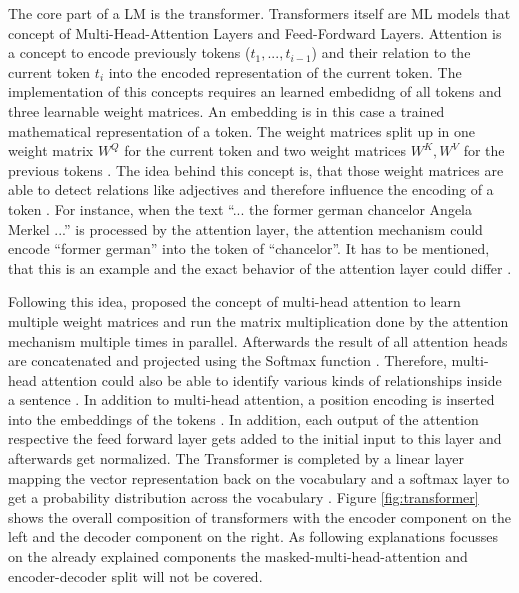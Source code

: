 \documentclass[a4paper,oneside,bibliography=totoc]{scrbook}
\begin{document}
The core part of a \ac{LM} is the transformer. Transformers itself are \ac{ML} models that concept of Multi-Head-Attention Layers and Feed-Fordward Layers. Attention is a concept to encode previously tokens ($t_1,...,t_{i-1}$) and their relation to the current token $t_i$ into the encoded representation of the current token. The implementation of this concepts requires an learned embedidng of all tokens and three learnable weight matrices. An embedding is in this case a trained mathematical representation of a token. The weight matrices split up in one weight matrix $W^Q$ for the current token and two weight matrices $W^K, W^V$ for the previous tokens \cite{Vaswani2023}. The idea behind this concept is, that those weight matrices are able to detect relations like adjectives and therefore influence the encoding of a token \cite{Sanderson2024}. For instance, when the text \enquote{... the former german chancelor Angela Merkel ...} is processed by the attention layer, the attention mechanism could encode \enquote{former german} into the token of \enquote{chancelor}. It has to be mentioned, that this is an example and the exact behavior of the attention layer could differ \cite{Sanderson2024}.

Following this idea, \citet{Vaswani2023} proposed the concept of multi-head attention to learn multiple weight matrices and run the matrix multiplication done by the attention mechanism multiple times in parallel. Afterwards the result of all attention heads are concatenated and projected using the Softmax function \cite{Vaswani2023}. Therefore, multi-head attention could also be able to identify various kinds of relationships inside a sentence \cite{Sanderson2024}. In addition to multi-head attention, a position encoding is inserted into the embeddings of the tokens \cite{Vaswani2023}. In addition, each output of the attention respective the feed forward layer gets added to the initial input to this layer and afterwards get normalized. The Transformer is completed by a linear layer mapping the vector representation back on the vocabulary and a softmax layer to get a probability distribution across the vocabulary \cite{Vaswani2023}. Figure \ref{fig:transformer} shows the overall composition of transformers with the encoder component on the left and the decoder component on the right. As following explanations focusses on the already explained components the masked-multi-head-attention and encoder-decoder split will not be covered.
\end{document}
